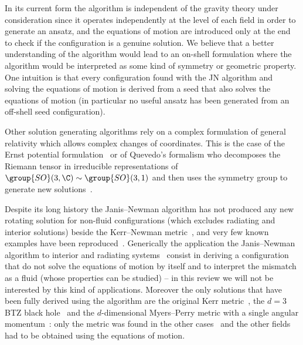 In its current form the algorithm is independent of the gravity theory under consideration since it operates independently at the level of each field in order to generate an ansatz, and the equations of motion are introduced only at the end to check if the configuration is a genuine solution.
We believe that a better understanding of the algorithm would lead to an on-shell formulation where the algorithm would be interpreted as some kind of symmetry or geometric property.
One intuition is that every configuration found with the JN algorithm and solving the equations of motion is derived from a seed that also solves the equations of motion (in particular no useful ansatz has been generated from an off-shell seed configuration).

Other solution generating algorithms rely on a complex formulation of general relativity which allows complex changes of coordinates.
This is the case of the Ernst potential formulation~\cite{Ernst:1968:NewFormulationAxially-1, Ernst:1968:NewFormulationAxially-2} or of Quevedo's formalism who decomposes the Riemann tensor in irreducible representations of $\group{SO}(3,\C) \sim \group{SO}(3,1)$ and then uses the symmetry group to generate new solutions~\cite{Quevedo:1992:ComplexTransformationsCurvature, Quevedo:1992:DeterminationMetricCurvature}.



Despite its long history the Janis--Newman algorithm has not produced any new rotating solution for non-fluid configurations (which excludes radiating and interior solutions) beside the Kerr--Newman metric~\cite{Newman:1965:MetricRotatingCharged}, and very few known examples have been reproduced~\cite{Newman:1965:NoteKerrSpinningParticle, Xu:1988:ExactSolutionsEinstein, Kim:1997:NotesSpinningAdS3, Kim:1999:SpinningBTZBlack, Yazadjiev:2000:NewmanJanisMethodRotating}.
Generically the application the Janis--Newman algorithm to interior and radiating systems~\cite{Herrera:1982:ComplexificationNonrotatingSphere, Drake:1997:ApplicationNewmanJanisAlgorithm, Glass:2004:KottlerLambdaKerrSpacetime, Ibohal:2005:RotatingMetricsAdmitting, AzregAinou:2014:GeneratingRotatingRegular, AzregAinou:2014:StaticRotatingConformal} consist in deriving a configuration that do not solve the equations of motion by itself and to interpret the mismatch as a fluid (whose properties can be studied) -- in this review we will not be interested by this kind of applications.
Moreover the only solutions that have been fully derived using the algorithm are the original Kerr metric~\cite{Newman:1965:NoteKerrSpinningParticle}, the $d = 3$ BTZ black hole~\cite{Kim:1997:NotesSpinningAdS3, Kim:1999:SpinningBTZBlack} and the $d$-dimensional Myers--Perry metric with a single angular momentum~\cite{Xu:1988:ExactSolutionsEinstein}: only the metric was found in the other cases~\cite{Newman:1965:MetricRotatingCharged, Yazadjiev:2000:NewmanJanisMethodRotating} and the other fields had to be obtained using the equations of motion.


